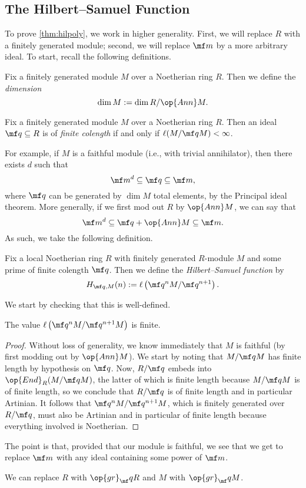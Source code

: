 \subsection{The Hilbert--Samuel Function}
To prove \autoref{thm:hilpoly}, we work in higher generality. First, we will replace $R$ with a finitely generated module; second, we will replace $\mf m$ by a more arbitrary ideal. To start, recall the following definitions.
\begin{definition}
	Fix a finitely generated module $M$ over a Noetherian ring $R$. Then we define the \textit{dimension}
	\[\dim M:=\dim R/\op{Ann}M.\]
\end{definition}
\begin{definition}
	Fix a finitely generated module $M$ over a Noetherian ring $R$. Then an ideal $\mf q\subseteq R$ is of \textit{finite colength} if and only if $\ell(M/\mf qM)<\infty$.
\end{definition}
For example, if $M$ is a faithful module (i.e., with trivial annihilator), then there exists $d$ such that
\[\mf m^d\subseteq\mf q\subseteq\mf m,\]
where $\mf q$ can be generated by $\dim M$ total elements, by the Principal ideal theorem. More generally, if we first mod out $R$ by $\op{Ann}M$, we can say that
\[\mf m^d\subseteq\mf q+\op{Ann}M\subseteq\mf m.\]
As such, we take the following definition.
\begin{definition}
	Fix a local Noetherian ring $R$ with finitely generated $R$-module $M$ and some prime of finite colength $\mf q$. Then we define the \textit{Hilbert--Samuel function} by
	\[H_{\mf q,M}(n):=\ell\left(\mf q^nM/\mf q^{n+1}\right).\]
\end{definition}
We start by checking that this is well-defined.
\begin{lemma}
	The value $\ell\left(\mf q^nM/\mf q^{n+1}M\right)$ is finite.
\end{lemma}
\begin{proof}
	Without loss of generality, we know immediately that $M$ is faithful (by first modding out by $\op{Ann}M$). We start by noting that $M/\mf qM$ has finite length by hypothesis on $\mf q$. Now, $R/\mf q$ embeds into $\op{End}_R(M/\mf qM)$, the latter of which is finite length because $M/\mf qM$ is of finite length, so we conclude that $R/\mf q$ is of finite length and in particular Artinian. It follows that $\mf q^nM/\mf q^{n+1}M$, which is finitely generated over $R/\mf q$, must also be Artinian and in particular of finite length because everything involved is Noetherian.
\end{proof}
The point is that, provided that our module is faithful, we see that we get to replace $\mf m$ with any ideal containing some power of $\mf m$.
\begin{remark}
	We can replace $R$ with $\op{gr}_\mf qR$ and $M$ with $\op{gr}_\mf qM$.
\end{remark}

